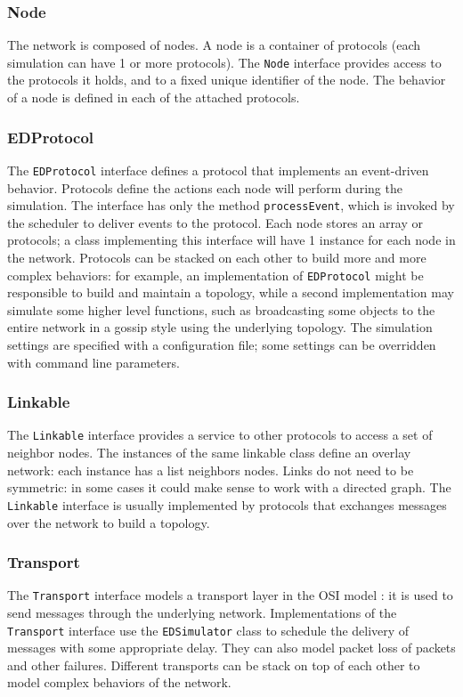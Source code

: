 \subsubsection{Node}
The network is composed of nodes.
A node is a container of protocols (each simulation can have \num{1} or more protocols).
The \texttt{Node} interface provides access to the protocols it holds, and to a fixed unique identifier of the node.
The behavior of a node is defined in each of the attached protocols.

\subsubsection{EDProtocol}
The \texttt{EDProtocol} interface defines a protocol that implements an event-driven behavior.
Protocols define the actions each node will perform during the simulation.
The interface has only the method \texttt{processEvent}, which is invoked by the scheduler to deliver events to the protocol.
Each node stores an array or protocols;
a class implementing this interface will have \num{1} instance for each node in the network.
Protocols can be stacked on each other to build more and more complex behaviors:
for example, an implementation of \texttt{EDProtocol} might be responsible to build and maintain a topology, while a second implementation may simulate some higher level functions, such as broadcasting some objects to the entire network in a gossip style using the underlying topology.
The simulation settings are specified with a configuration file;
some settings can be overridden with command line parameters.

\subsubsection{Linkable}
The \texttt{Linkable} interface provides a service to other protocols to access a set of neighbor nodes.
The instances of the same linkable class define an overlay network:
each instance has a list neighbors nodes.
Links do not need to be symmetric:
in some cases it could make sense to work with a directed graph.
The \texttt{Linkable} interface is usually implemented by protocols that exchanges messages over the network to build a topology.

\subsubsection{Transport}
The \texttt{Transport} interface models a transport layer in the OSI model \cite{wikipedia_osi}:
it is used to send messages through the underlying network.
Implementations of the \texttt{Transport} interface use the \texttt{EDSimulator} class to schedule the delivery of messages with some appropriate delay.
They can also model packet loss of packets and other failures.
Different transports can be stack on top of each other to model complex behaviors of the network.

